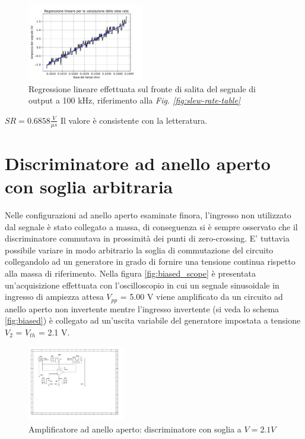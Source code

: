 \documentclass[journal]{IEEEtran}
\begin{document}
\begin{figure}[H]%
\begin {center}
\includegraphics[width=0.45\textwidth]{analysis/output/OPA-slew-rate-fit.pdf}
\caption{Regressione lineare effettuata sul fronte di salita del segnale di output a 100 kHz, riferimento alla \textit{Fig. \ref{fig:slew-rate-table}}}
\label{fig:slew-rate-fit}
\end {center}
\end{figure}
$SR = 0.6858 \frac{V}{\mu s}$
Il valore è consistente con la letteratura.
\section{Discriminatore ad anello aperto con soglia arbitraria} %

Nelle configurazioni ad anello aperto esaminate finora, l'ingresso non utilizzato dal segnale è stato collegato a massa, di conseguenza si è sempre osservato che il discriminatore commutava in prossimità dei punti di zero-crossing. E' tuttavia possibile variare in modo arbitrario la soglia di commutazione del circuito collegandolo ad un generatore in grado di fornire una tensione continua rispetto alla massa di riferimento. Nella figura \ref{fig:biased_scope} è presentata un'acquisizione effettuata con l'oscilloscopio in cui un segnale sinusoidale in ingresso di ampiezza attesa $V_{pp}$ = 5.00 V viene amplificato da un circuito ad anello aperto non invertente mentre l'ingresso invertente (si veda lo schema \ref{fig:biased}) è collegato ad un'uscita variabile del generatore impostata a tensione $V_2$ = $V_{th}$ = 2.1 V. 

\begin{figure}[H]%
\begin {center}
\includegraphics[width=0.38\textwidth]{sch-simulations/output/OPA-biased.pdf}
\caption{Amplificatore ad anello aperto: discriminatore con soglia a $V = 2.1 V$}
\label{fig:oscilloscope}
\end {center}
\end{figure}
\end{document}
